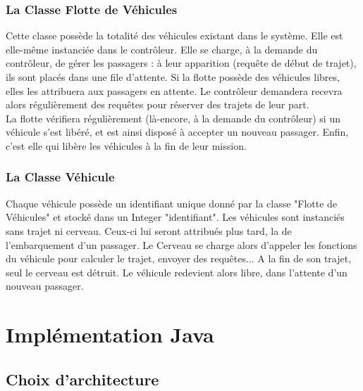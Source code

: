 \documentclass[a4paper, titlepage]{report}
\begin{document}
\section{La Classe Flotte de Véhicules}

Cette classe possède la totalité des véhicules existant dans le système. Elle est elle-même instanciée dans le contrôleur. Elle se charge, à la demande du contrôleur, de gérer les passagers : à leur apparition (requête de début de trajet), ils sont placés dans une file d'attente. Si la flotte possède des véhicules libres, elles les attribuera aux passagers en attente. Le contrôleur demandera recevra alors régulièrement des requêtes pour réserver des trajets de leur part.\\
La flotte vérifiera régulièrement (là-encore, à la demande du contrôleur) si un véhicule s'est libéré, et est ainsi disposé à accepter un nouveau passager.
Enfin, c'est elle qui libère les véhicules à la fin de leur mission.
\section{La Classe Véhicule}

Chaque véhicule possède un identifiant unique donné par la classe "Flotte de Véhicules" et stocké  dans un Integer "identifiant". Les véhicules sont instanciés sans trajet ni cerveau. Ceux-ci lui seront attribués plus tard, la de l'embarquement d'un passager. Le Cerveau se charge alors d'appeler les fonctions du véhicule pour calculer le trajet, envoyer des requêtes...
A la fin de son trajet, seul le cerveau est détruit. Le véhicule  redevient alors libre, dans l'attente d'un nouveau passager.
\setcounter{chapter}{0}
\part{Implémentation Java}
\chapter{Choix d'architecture}
\end{document}

